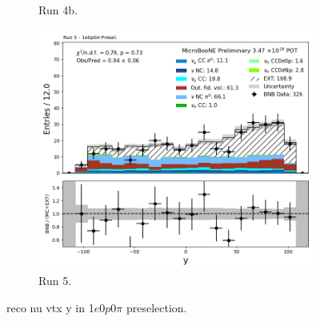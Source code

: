 \begin{figure}[H]
\begin{subfigure}[t]{0.32\linewidth}
        \caption{Run 4b.}
    \end{subfigure}%
    \hspace{0.2cm}%
    \begin{subfigure}[t]{0.32\linewidth}
        \includegraphics[width=\linewidth]{technote/Appendix_Preselection/Figures/1e0p0pi/Run5/reco_nu_vtx_y_Run5_1e0p0pi_Presel.png}
        \caption{Run 5.}
    \end{subfigure}
    \caption{reco nu vtx y in 1$e$0$p$0$\pi$ preselection.}
\end{figure}

